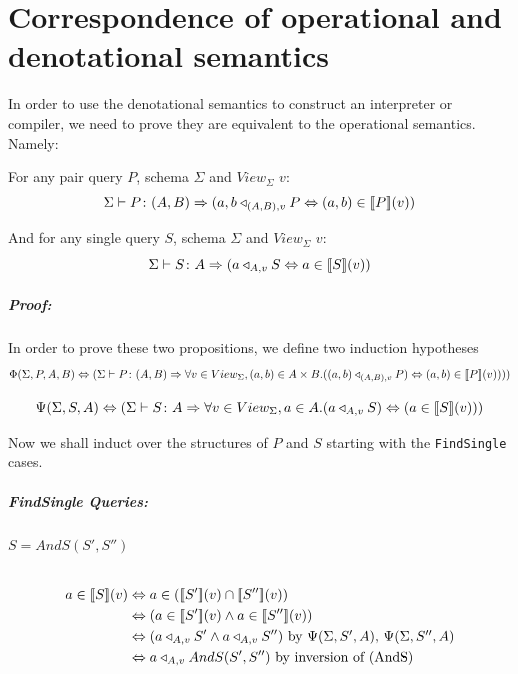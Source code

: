 \documentclass[12pt,a4paper,twoside,openright]{report}
\newcommand\codeName[1]{\texttt{#1}}
\newcommand{\db}[1]{{\bf [\![}#1{\bf ]\!]}}
\newcommand{\deno}[1]{\db{#1}(v)}
\newcommand{\typeRule}[2]{\Sigma\vdash #1 \colon #2}
\newcommand{\denoRule}[2]{#1 \in \deno{#2}}
\newcommand{\opRule}[3]{#1 \triangleleft_{#2, v} #3}
\newcommand{\phiRule}[3]{\Phi(\Sigma, #1, #2, #3)}
\newcommand{\psiRule}[2]{\Psi(\Sigma, #1, #2)}
\begin{document}
\prevdepth\tpd

\chapter{Correspondence of operational and denotational semantics}
\label{DenoOper}
In order to use the denotational semantics to construct an interpreter or compiler, we need to prove they are equivalent to the operational semantics. Namely:

For any pair query $P$, schema $\Sigma$ and $View_{\Sigma}$ $v$:
\[
\typeRule{P}{(A, B)}\Rightarrow \opRule{(a, b}{(A, B)}{P} \Leftrightarrow \denoRule{(a, b)}{P})
\]

And for any single query $S$, schema $\Sigma$ and $View_{\Sigma}$ $v$: 
\[
\typeRule{S}{A}\Rightarrow \opRule{(a}{A}{S} \Leftrightarrow \denoRule{a}{S})
\]

\paragraph{Proof: }In order to prove these two propositions, we define two induction hypotheses
\[
\phiRule{P}{A}{B} \Leftrightarrow (\typeRule{P}{(A, B)} \Rightarrow \forall v \in View_{\Sigma}, (a, b) \in A \times B. (\opRule{(a, b)}{(A, B)}{P}) \Leftrightarrow \denoRule{(a, b)}{P})))
\]

\[
\psiRule{S}{A} \Leftrightarrow (\typeRule{S}{A} \Rightarrow \forall v \in View_{\Sigma}, a \in A. (\opRule{a}{A}{S}) \Leftrightarrow (\denoRule{a}{S}))
\]

Now we shall induct over the structures of $P$ and $S$ starting with the \codeName{FindSingle} cases.

\paragraph{FindSingle Queries:}

\subparagraph{$S = AndS(S', S'')$}
\begin{equation} \label{case AndS}
\begin{split}
\denoRule{a}{S} & \Leftrightarrow a \in (\deno{S'} \cap \deno{S''}) \\
				& \Leftrightarrow (\denoRule{a}{S'} \wedge \denoRule{a}{S''}) \\
				& \Leftrightarrow (\opRule{a}{A}{S'} \wedge \opRule{a}{A}{S''}) \mbox{ by $\psiRule{S'}{A}$, $\psiRule{S''}{A}$}\\
				& \Leftrightarrow \opRule{a}{A}{AndS(S', S'')} \mbox{ by inversion of (AndS)}
\end{split}
\end{equation}
\end{document}
